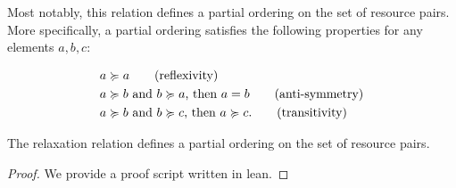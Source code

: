Most notably, this relation defines a partial ordering on the set of resource pairs. More specifically, a partial ordering satisfies the following properties for any elements \(a, b, c\):

\begin{align}
   & a \relaxation a \tag{reflexivity} \\
   & a \relaxation b \text{ and } b \relaxation a\text{, then } a = b \tag{anti-symmetry}\\
   & a \relaxation b \text{ and } b \relaxation c\text{, then } a \relaxation c. \tag{transitivity}
\end{align}

\begin{lemma}
   The relaxation relation defines a partial ordering on the set of resource pairs.
\end{lemma}

\begin{proof}
   We provide a proof script written in lean.
\end{proof}



